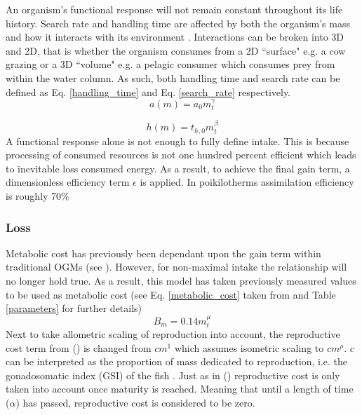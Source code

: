\documentclass[a4paper, 11pt, hidelinks]{article} %
\begin{document}
	An organism's functional response will not remain constant throughout its life history.  Search rate and handling time are affected by both the organism's mass and how it interacts with its environment \parencite{Pawar2012}.  
	Interactions can be broken into 3D and 2D, that is whether the organism consumes from a 2D ``surface" e.g. a cow grazing or a 3D ``volume" e.g. a pelagic consumer which consumes prey from within the water column.  As such, both handling time and search rate can be defined as Eq. \ref{handling_time} and Eq. \ref{search_rate} respectively.
	\begin{equation}
		\label{search_rate}
		a(m) = a_0 m_t^\gamma
	\end{equation}
	
	\begin{equation}
		\label{handling_time}
		h(m) = t_{h,0} m_t^\beta
	\end{equation}
	A functional response alone is not enough to fully define intake.  This is because processing of consumed resources is not one hundred percent efficient which leads to inevitable loss consumed energy.  As a result, to achieve the final gain term, a dimensionless efficiency term $\epsilon$ is applied.  In poikilotherms assimilation efficiency is roughly 70\% \parencite{Peters1983}
	
	\subsubsection{Loss}
	Metabolic cost  has previously been dependant upon the gain term within traditional OGMs (see \cite{West2001, Hou2008}).  However, for non-maximal intake the relationship will no longer hold true.  As a result, this model has taken previously measured values to be used as metabolic cost (see Eq. \ref{metabolic_cost} taken from \cite{Peters1983} %
	and Table \ref{parameters} for further details)
	\begin{equation}
		\label{metabolic_cost}
		B_m = 0.14 m_t^\mu
	\end{equation}
	Next to take allometric scaling of reproduction into account, the reproductive cost term from \citeauthor{Charnov2001} (\citeyear{Charnov2001}) is changed from $cm^1$ which assumes isometric scaling to $cm^\rho$.  $c$ can be interpreted as the proportion of mass dedicated to reproduction, i.e. the gonadosomatic index (GSI) of the fish \parencite{Charnov2001}.  Just as in \citeauthor{Charnov2001} (\citeyear{Charnov2001}) reproductive cost is only taken into account once maturity is reached.  Meaning that until a length of time ($\alpha$) has passed, reproductive cost is considered to be zero.
	
\end{document}
